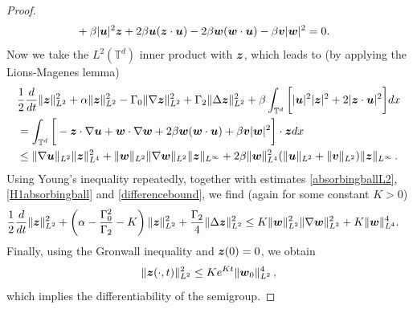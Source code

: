 \documentclass[10pt,a4paper]{amsart}
\newcommand{\Gamtwo}{\Gamma_{2}}
\newcommand{\Gamzero}{\Gamma_{0}}
\newcommand{\Rb}{\beta}
\newcommand{\bu}{\mbox{\boldmath$u$}}
\newcommand{\bv}{\mbox{\boldmath$v$}}
\newcommand{\bw}{\mbox{\boldmath$w$}}
\newcommand{\bz}{\mbox{\boldmath$z$}}
\begin{document}
\begin{proof}
\begin{align*}
&+ \Rb \lvert \bu \rvert^2 \bz + 2 \Rb \bu (\bz \cdot \bu) - 2 \Rb \bw (\bw \cdot \bu) - \Rb \bv \lvert \bw \rvert^2 = 0.
\end{align*}
Now we take the $L^2 (\mathbb{T}^d)$ inner product with $\bz$, which leads to (by applying the Lions-Magenes lemma)
\begin{align*}
&\frac{1}{2} \frac{d}{d t} \lVert \bz \rVert_{L^2}^2 + \alpha \lVert \bz \rVert_{L^2}^2 - \Gamzero \lVert \nabla \bz \rVert_{L^2}^2 + \Gamtwo \lVert \Delta \bz \rVert_{L^2}^2 + \Rb \int_{\mathbb{T}^d} \bigg[ \lvert \bu \rvert^2 \lvert \bz \rvert^2 + 2 \lvert \bz \cdot \bu \rvert^2 \bigg] dx \\
&= \int_{\mathbb{T}^d} \bigg[- \bz \cdot \nabla \bu + \bw \cdot \nabla \bw + 2 \Rb \bw (\bw \cdot \bu) + \Rb \bv \lvert \bw \rvert^2  \bigg] \cdot \bz dx \\
&\leq \lVert \nabla \bu \rVert_{L^2} \lVert \bz \rVert_{L^4}^2 + \lVert \bw \rVert_{L^2} \lVert \nabla \bw \rVert_{L^2} \lVert \bz \rVert_{L^\infty} + 2 \Rb \lVert \bw \rVert_{L^4}^2 (\lVert \bu \rVert_{L^2} + \lVert \bv \rVert_{L^2}) \lVert \bz \rVert_{L^\infty} \,.
\end{align*}
Using Young's inequality repeatedly, together with estimates \eqref{absorbingballL2}, \eqref{H1absorbingball} and \eqref{differencebound}, we find (again for some constant $K > 0$)
\begin{align*}
&\frac{1}{2} \frac{d}{d t} \lVert \bz \rVert_{L^2}^2 + \left(\alpha - \frac{\Gamzero^2}{\Gamtwo} - K \right) \lVert \bz \rVert_{L^2}^2 + \frac{\Gamtwo}{4} \lVert \Delta \bz \rVert_{L^2}^2 \leq K \lVert \bw \rVert_{L^2}^2 \lVert \nabla \bw \rVert_{L^2}^2 + K \lVert \bw \rVert_{L^4}^4.
\end{align*}
Finally, using the Gronwall inequality and $\bz (0) = 0$, we obtain 
\begin{equation}
\lVert \bz (\cdot, t) \rVert_{L^2}^2 \leq K e^{K t} \lVert \bw_0 \rVert_{L^2}^4\,,
\end{equation}
which implies the differentiability of the semigroup.
\end{proof}
\end{document}
